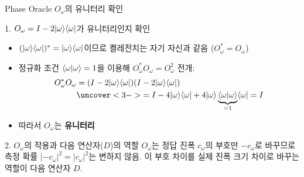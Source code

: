 \documentclass[aspectratio=169, 10pt]{beamer}
\begin{document}
\begin{frame}{Phase Oracle $O_\omega$의 유니터리 확인}
    \begin{qcblock}{1. $O_\omega = I - 2|\omega\rangle\langle\omega|$가 유니터리인지 확인}
        \begin{itemize}
            \item $(|\omega\rangle\langle\omega|)^* = |\omega\rangle\langle\omega|$이므로 켤레전치는 자기 자신과 같음 ($O_\omega^* = O_\omega$)
            \pause
            \item 정규화 조건 $\langle\omega|\omega\rangle = 1$을 이용해 $O_\omega^* O_\omega = O_\omega^2$ 전개:
            \begin{align*}
                O_\omega^* O_\omega &= (I - 2\ket{\omega}\bra{\omega})(I - 2\ket{\omega}\bra{\omega}) \\
                &\uncover<3->{= I - 4\ket{\omega}\bra{\omega} + 4\ket{\omega}\underbrace{\braket{\omega}{\omega}}_{=1}\bra{\omega} = I}
            \end{align*}
            \pause[4]
            \item 따라서 $O_\omega$는 \textbf{유니터리}
        \end{itemize}
    \end{qcblock}
    \pause
    \vspace{0.08cm}
    \begin{qcalert}{2. $O_\omega$의 작용과 다음 연산자($D$)의 역할}
        $O_\omega$는 정답 진폭 $c_\omega$의 부호만 $-c_\omega$로 바꾸므로 측정 확률 $|-c_\omega|^2 = |c_\omega|^2$는 변하지 않음. 이 부호 차이를 실제 진폭 크기 차이로 바꾸는 역할이 다음 연산자 $D$.
    \end{qcalert}
\end{frame}
\end{document}
